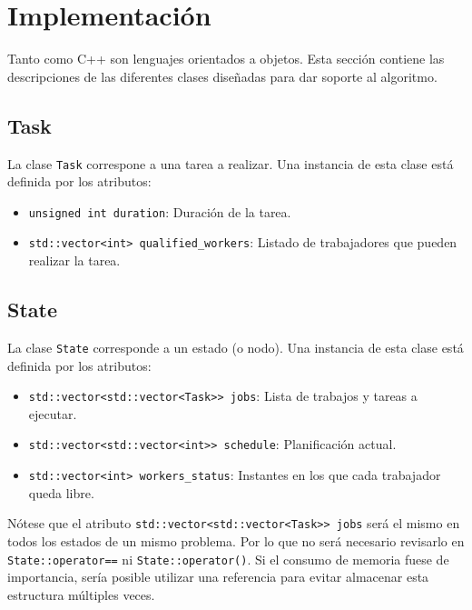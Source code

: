 \pagebreak

\section{Implementación}

Tanto \Python como C++ son lenguajes orientados a objetos.
Esta sección contiene las descripciones de las diferentes
clases diseñadas para dar soporte al algoritmo.

\subsection{Task}

La clase \lstinline{Task} correspone a una tarea a realizar.
Una instancia de esta clase está definida por los atributos:
\begin{itemize}[itemsep=0.25px]
    \item \lstinline{unsigned int duration}: Duración de la tarea.
    \item \lstinline{std::vector<int> qualified_workers}: Listado de trabajadores que pueden realizar la tarea.
\end{itemize}

\subsection{State}

La clase \lstinline{State} corresponde a un estado (o nodo).
Una instancia de esta clase está definida por los atributos:
\begin{itemize}[itemsep=0.25px]
    \item \lstinline{std::vector<std::vector<Task>> jobs}: Lista de trabajos y tareas a ejecutar.
    \item \lstinline{std::vector<std::vector<int>> schedule}: Planificación actual.
    \item \lstinline{std::vector<int> workers_status}: Instantes en los que cada trabajador queda libre.
\end{itemize}

\begin{notebox}
    Nótese que el atributo \lstinline{std::vector<std::vector<Task>> jobs} será el mismo
    en todos los estados de un mismo problema.
    Por lo que no será necesario revisarlo en
    \lstinline{State::operator==} ni \lstinline{State::operator()}.
    Si el consumo de memoria fuese de importancia,
    sería posible utilizar una referencia para evitar
    almacenar esta estructura múltiples veces.
\end{notebox}

